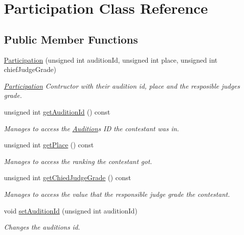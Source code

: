 \hypertarget{class_participation}{}\section{Participation Class Reference}
\label{class_participation}
\subsection*{Public Member Functions}
\begin{DoxyCompactItemize}
\item 
\hyperlink{class_participation_a7007df223dc88b9bd9a43f0b9d46d4f4}{Participation} (unsigned int audition\+Id, unsigned int place, unsigned int chief\+Judge\+Grade)
\begin{DoxyCompactList}\small\item\em \hyperlink{class_participation}{Participation} Contructor with their audition id, place and the resposible judge\textquotesingle{}s grade. \end{DoxyCompactList}\item 
unsigned int \hyperlink{class_participation_aede9a8356da23d9ee7f4c9c422a05945}{get\+Audition\+Id} () const
\begin{DoxyCompactList}\small\item\em Manages to access the \hyperlink{class_audition}{Audition}\textquotesingle{}s ID the contestant was in. \end{DoxyCompactList}\item 
unsigned int \hyperlink{class_participation_a67add733b1f6fe05b47ebd883486cb3c}{get\+Place} () const
\begin{DoxyCompactList}\small\item\em Manages to access the ranking the contestant got. \end{DoxyCompactList}\item 
unsigned int \hyperlink{class_participation_ad13c6d16677eefc0fb304b074bff97f6}{get\+Chied\+Judge\+Grade} () const
\begin{DoxyCompactList}\small\item\em Manages to access the value that the responsible judge grade the contestant. \end{DoxyCompactList}\item 
void \hyperlink{class_participation_a0cbd915372021b71926187605f94b386}{set\+Audition\+Id} (unsigned int audition\+Id)
\begin{DoxyCompactList}\small\item\em Changes the audition\textquotesingle{}s id. \end{DoxyCompactList}\item 

\end{DoxyCompactItemize}
